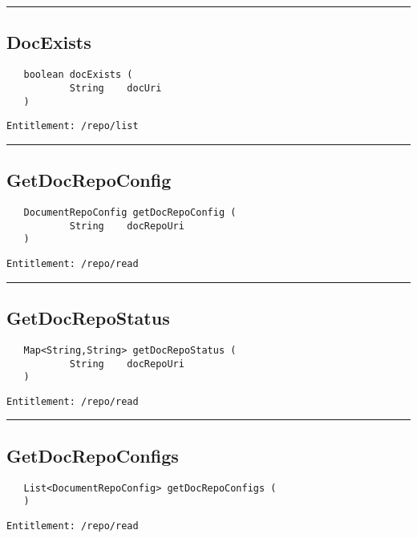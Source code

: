 \rule{12cm}{2pt}
\subsection{DocExists}
\label{Api:DocExists}
\begin{Verbatim}
   boolean docExists (
           String    docUri
   )
\end{Verbatim}
\begin{Verbatim}[formatcom=\color{Maroon}]
  Entitlement: /repo/list
\end{Verbatim}



\rule{12cm}{2pt}
\subsection{GetDocRepoConfig}
\label{Api:GetDocRepoConfig}
\begin{Verbatim}
   DocumentRepoConfig getDocRepoConfig (
           String    docRepoUri
   )
\end{Verbatim}
\begin{Verbatim}[formatcom=\color{Maroon}]
  Entitlement: /repo/read
\end{Verbatim}



\rule{12cm}{2pt}
\subsection{GetDocRepoStatus}
\label{Api:GetDocRepoStatus}
\begin{Verbatim}
   Map<String,String> getDocRepoStatus (
           String    docRepoUri
   )
\end{Verbatim}
\begin{Verbatim}[formatcom=\color{Maroon}]
  Entitlement: /repo/read
\end{Verbatim}



\rule{12cm}{2pt}
\subsection{GetDocRepoConfigs}
\label{Api:GetDocRepoConfigs}
\begin{Verbatim}
   List<DocumentRepoConfig> getDocRepoConfigs (
   )
\end{Verbatim}
\begin{Verbatim}[formatcom=\color{Maroon}]
  Entitlement: /repo/read
\end{Verbatim}



